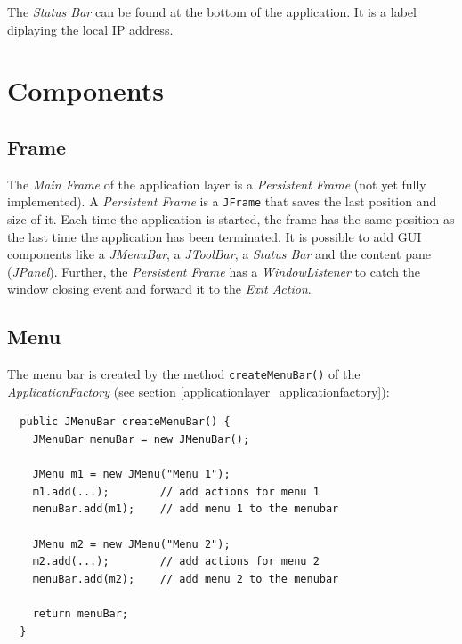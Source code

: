 The \textit{Status Bar} can be found at the bottom of the application. It is a label diplaying the local IP address.

\section{Components}
\label{applicationlayer_component_desc}

\subsection{Frame}
\label{applicationlayer_frame_desc}
The \textit{Main Frame} of the application layer is a \textit{Persistent Frame} (not yet fully implemented). A \textit{Persistent Frame} is a \texttt{JFrame} that saves the last position and size of it. Each time the application is started, the frame has the same position as the last time the application has been terminated. It is possible to add GUI components like a \textit{JMenuBar}, a \textit{JToolBar}, a \textit{Status Bar} and the content pane (\textit{JPanel}). Further, the \textit{Persistent Frame} has a \textit{WindowListener} to catch the window closing event and forward it to the \textit{Exit Action}.

\subsection{Menu}

%

The menu bar is created by the method \texttt{createMenuBar()} of the \textit{ApplicationFactory} (see section \ref{applicationlayer_applicationfactory}):

\begin{verbatim}
  public JMenuBar createMenuBar() {
    JMenuBar menuBar = new JMenuBar();

    JMenu m1 = new JMenu("Menu 1");
    m1.add(...);        // add actions for menu 1
    menuBar.add(m1);    // add menu 1 to the menubar
    
    JMenu m2 = new JMenu("Menu 2");
    m2.add(...);        // add actions for menu 2
    menuBar.add(m2);    // add menu 2 to the menubar
    
    return menuBar;
  }
\end{verbatim}

